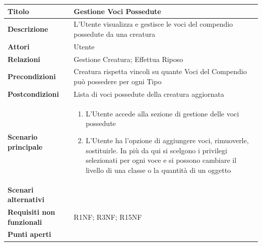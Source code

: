 \documentclass[a4paper, 11pt]{article}
\begin{document}
\begin{center}
\begin{tabular}{ |p{5cm}|p{9.5cm}|  }
\hline
\textbf{Titolo} & Gestione Voci Possedute \\
\hline
\textbf{Descrizione} & L'Utente visualizza e gestisce le voci del compendio possedute da una creatura \\
\hline
\textbf{Attori} & Utente \\
\hline
\textbf{Relazioni} & Gestione Creatura; Effettua Riposo \\
\hline
\textbf{Precondizioni} & Creatura rispetta vincoli su quante Voci del Compendio può possedere per ogni Tipo \\
\hline
\textbf{Postcondizioni} & Lista di voci possedute della creatura aggiornata \\
\hline
\textbf{Scenario principale} & 
\begin{enumerate}
    \item L'Utente accede alla sezione di gestione delle voci possedute
    \item L'Utente ha l'opzione di aggiungere voci, rimuoverle, sostituirle. In più da qui si scelgono i privilegi selezionati per ogni voce e si possono cambiare il livello di una classe o la quantità di un oggetto
\end{enumerate}\\
\hline
\textbf{Scenari alternativi} & \\
\hline
\textbf{Requisiti non funzionali} & R1NF; R3NF; R15NF\\
\hline
\textbf{Punti aperti} & \\
\hline
\end{tabular}

\vspace{3em}


\end{center}
\end{document}
